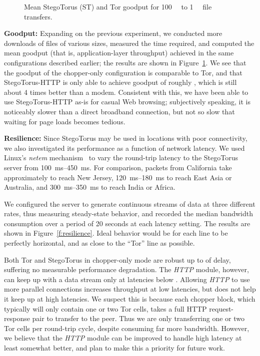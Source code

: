 \begin{figure}[ht!]
\centering

\caption{Mean StegoTorus (ST) and Tor goodput for \SI{100}{\kilo\byte}
  to \SI{1}{\mega\byte} file transfers.}\label{f:goodput}
\end{figure}

\smallskip\noindent\textbf{Goodput:} Expanding on the previous
experiment, we conducted more downloads of files of various sizes,
measured the time required, and computed the mean goodput (that is,
application-layer throughput) achieved in the same configurations
described earlier; the results are shown in Figure~\ref{f:goodput}.
We see that the goodput of the chopper-only configuration is
comparable to Tor, and that StegoTorus-HTTP is only able to achieve
goodput of roughly , which is still about 4 times better than
a  modem.  Consistent with this, we have been able to use
StegoTorus-HTTP as-is for casual Web browsing; subjectively speaking,
it is noticeably slower than a direct broadband connection, but not so
slow that waiting for page loads becomes tedious.

\smallskip\noindent\textbf{Resilience:} Since StegoTorus may be used
in locations with poor connectivity, we also investigated its
performance as a function of network latency.  We used Linux's
\textit{netem} mechanism~\cite{s-netem} to vary the round-trip latency
to the StegoTorus server from \SIrange{100}{450}{\milli\second}.  For
comparison, packets from California take approximately  to
reach New Jersey, \SIrange{120}{180}{\milli\second} to reach East Asia or
Australia, and \SIrange{300}{350}{\milli\second} to reach India or Africa.

We configured the server to generate continuous streams of data at
three different rates, thus measuring steady-state behavior, and
recorded the median bandwidth consumption over a period of 20 seconds
at each latency setting.  The results are shown in
Figure~\ref{f:resilience}.  Ideal behavior would be for each line to
be perfectly horizontal, and as close to the “Tor” line as possible.

Both Tor and StegoTorus in chopper-only mode are robust up to
 of delay, suffering no measurable performance degradation.
The \textit{HTTP} module, however, can keep up with a  data
stream only at latencies below .  Allowing \textit{HTTP} to
use more parallel connections increases throughput at low latencies,
but does not help it keep up at high latencies.  We suspect this is
because each chopper block, which typically will only contain one or
two Tor cells, takes a full HTTP request-response pair to transfer to
the peer.  Thus we are only transferring one or two Tor cells per
round-trip cycle, despite consuming far more bandwidth.  However, we
believe that the \textit{HTTP} module can be improved to handle high
latency at least somewhat better, and plan to make this a priority for
future work.
